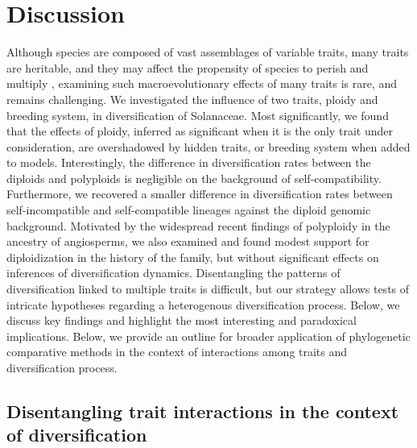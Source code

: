\section{Discussion}

%
Although species are composed of vast assemblages of variable traits, many traits are heritable, and they may affect the propensity of species to perish and multiply \citep{lewontin_1970}, examining such macroevolutionary effects of many traits is rare, and remains challenging.
We investigated the influence of two traits, ploidy and breeding system, in diversification of Solanaceae.
Most significantly, we found that the effects of ploidy, inferred as significant when it is the only trait under consideration, are overshadowed by hidden traits, or breeding system when added to models.  
Interestingly, the difference in diversification rates between the diploids and polyploids is negligible on the background of self-compatibility.
Furthermore, we recovered a smaller difference in diversification rates between self-incompatible and self-compatible lineages against the diploid genomic background. %
Motivated by the widespread recent findings of polyploidy in the ancestry of angiosperms, we also examined and found modest support for diploidization in the history of the family, but without significant effects on inferences of diversification dynamics. %
Disentangling the patterns of diversification linked to multiple traits is difficult, but our strategy allows tests of intricate hypotheses regarding a heterogenous diversification process.
Below, we discuss key findings and highlight the most interesting and paradoxical implications.
Below, we provide an outline for broader application of phylogenetic comparative methods in the context of interactions among traits and diversification process.

\subsection*{Disentangling trait interactions in the context of diversification} %

